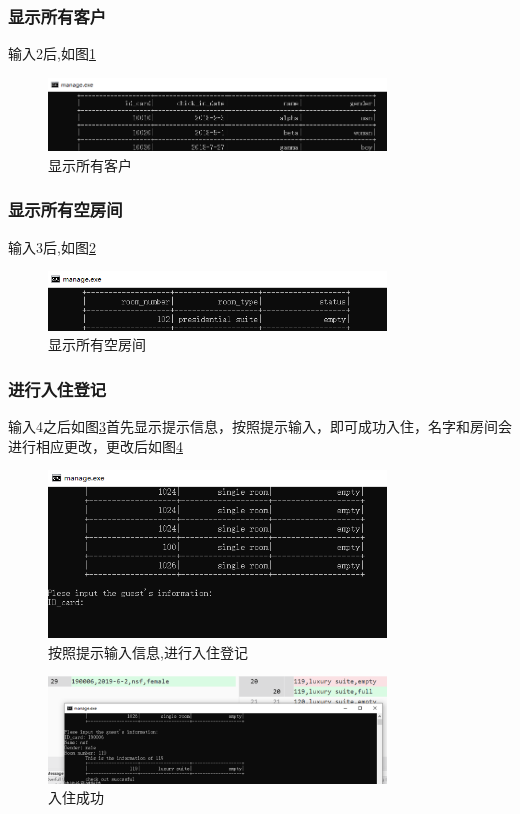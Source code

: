 \documentclass[UTF8]{ctexart}
\begin{document}
    \subsubsection{显示所有客户}
      输入2后,如图\ref{fig:2}
      \begin{figure}[H]
        \centering
        \includegraphics[width=0.8\textwidth]{2}
        \caption{显示所有客户}
        \label{fig:2}
      \end{figure}
    \subsubsection{显示所有空房间}
      输入3后,如图\ref{fig:3}
      \begin{figure}[H]
        \centering
        \includegraphics[width=0.8\textwidth]{3}
        \caption{显示所有空房间}
        \label{fig:3}
      \end{figure}
    \subsubsection{进行入住登记}
      输入4之后如图\ref{fig:4_1}首先显示提示信息，按照提示输入，即可成功入住，名字和房间会进行相应更改，更改后如图\ref{fig:4_2}
      \begin{figure}[H]
        \centering
        \includegraphics[width=0.8\textwidth]{4_1}
        \caption{按照提示输入信息,进行入住登记}
        \label{fig:4_1}
      \end{figure}
      \begin{figure}[H]
        \centering
        \includegraphics[width=0.8\textwidth]{4_2}
        \caption{入住成功}
        \label{fig:4_2}
      \end{figure}
\end{document}
